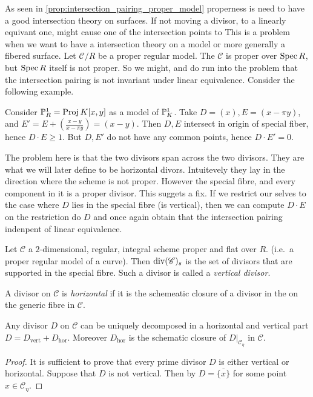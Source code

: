 
As seen in \cref{prop:intersection_pairing_proper_model} properness is need to have a good intersection theory on surfaces. 
If not moving a divisor, to a linearly equivant one, might cause one of the intersection points to 
This is a problem when we want to have a intersection theory on a model or more generally a fibered surface. 
Let $\mathscr C  / R $ be a proper regular model. 
The $\mathscr C$ is proper over $\operatorname{Spec} R$, but $\operatorname{Spec} R$ itself is not proper. 
So we might, and do run into the problem that the intersection pairing is not invariant under linear equivalence. Consider the following example.

\begin{example}
	Consider $\mathbb{P}^{1}_R = \operatorname{Proj} K[x, y]$ as a model of $\mathbb{P}^{1}_K$. 
	Take $D = (x), E = (x-\pi y )$, and $E' = E + (\frac{x-y}{x-\pi y})= (x - y)$.
	Then  $D, E$ intersect in origin of special fiber, hence $D\cdot E \ge 1$. 
	But $D, E'$ do not have any common points, hence $D \cdot E' = 0$. 
\end{example}

The problem here is that the two divisors span across the two divisors. They are what we will later define to be horizontal divors. Intuitevely they lay in the direction where the scheme is not proper. 
However the special fibre, and every component in it is a proper divisor. 
This suggets a fix.
If we restrict our selves to the case where $D$ lies in the special fibre (is vertical), then we can compute $D\cdot E$ on the restriction do $D$ and once again obtain that the intersection pairing indenpent of linear equivalence. 

\begin{definition}\label{def:vertical_divisor}
	Let $\mathscr{C}$ a $2$-dimensional, regular, integral scheme proper and flat over $R$.  (i.e.\ a proper regular model of a curve). 
	Then $\operatorname{div}(\mathscr{C})_s$ is the set of divisors that are supported in the special fibre. 
	Such a divisor is called a \emph{vertical divisor}.
\end{definition}
\begin{definition}\label{def:horizontal_divisor}
	A divisor on $\mathscr{C} $ is \emph{horizontal} if it is the schemeatic closure of a divisor in the on the generic fibre in $\mathscr C$. 
\end{definition}
\begin{lemma}\label{lem:decomponsition_horizontal_vertical}
	Any divisor $D$ on $\mathscr{C}$ can be uniquely decomposed in a horizontal and vertical part $D =  D_\text{vert}  + D_\text{hor}$. 
	Moreover $D_\text{hor} $ is the schematic closure of $D|_{\mathscr C_\eta}$ in $\mathscr C$.
\end{lemma}
\begin{proof}
	It is sufficient to prove that every prime divisor $D$ is either vertical or horizontal.
	Suppose that $D$ is not vertical. 
	Then by \cite[prop. 8.3.4]{liuAlgebraicGeometryArithmetic2002} $D = \overline{\{x\} }$ for some point $x \in \mathscr{C} _\eta$.
\end{proof}


